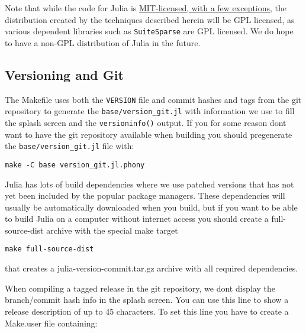 Note that while the code for Julia is \href{https://github.com/JuliaLang/julia/blob/master/LICENSE.md}{MIT-licensed, with a few exceptions}, the distribution created by the techniques described herein will be GPL licensed, as various dependent libraries such as \texttt{SuiteSparse} are GPL licensed. We do hope to have a non-GPL distribution of Julia in the future.



\hypertarget{10631287561622970973}{}


\subsection{Versioning and Git}



The Makefile uses both the \texttt{VERSION} file and commit hashes and tags from the git repository to generate the \texttt{base/version\_git.jl} with information we use to fill the splash screen and the \texttt{versioninfo()} output. If you for some reason don{\textquotesingle}t want to have the git repository available when building you should pregenerate the \texttt{base/version\_git.jl} file with:




\begin{lstlisting}
make -C base version_git.jl.phony
\end{lstlisting}



Julia has lots of build dependencies where we use patched versions that has not yet been included by the popular package managers. These dependencies will usually be automatically downloaded when you build, but if you want to be able to build Julia on a computer without internet access you should create a full-source-dist archive with the special make target




\begin{lstlisting}
make full-source-dist
\end{lstlisting}



that creates a julia-version-commit.tar.gz archive with all required dependencies.



When compiling a tagged release in the git repository, we don{\textquotesingle}t display the branch/commit hash info in the splash screen. You can use this line to show a release description of up to 45 characters. To set this line you have to create a Make.user file containing:





